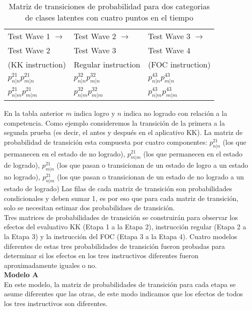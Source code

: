 \begin{table}[H]
	\centering
	\caption{Matriz de transiciones de probabilidad para dos categorias de clases latentes con cuatro puntos en el tiempo}
	\begin{tabular}{lll}
		Test Wave 1 $\rightarrow$ & Test Wave 2 $\rightarrow$ & Test Wave 3 $\rightarrow$ \\
		Test Wave 2 & Test Wave 3 & Test Wave 4 \\ 
		\hline  
		(KK instruction) & Regular instruction & (FOC instruction) \\ 
		\hline 
		$p_{n | n}^{21} p_{m | n }^{21}$ & $p_{n | n}^{32} p_{m | n }^{32}$ & $p_{n | n}^{43} p_{m | n}^{43}$ \\
		$p_{n | m}^{21} p_{m | m }^{21}$ & $p_{n | m}^{32} p_{m | m }^{32}$ & $p_{n | m}^{43} p_{m | m}^{43}$
	\end{tabular}
\end{table}
 
En la tabla anterior $m$ indica logro y $n$ indica no logrado con relaci\'{o}n a la competencia. Como ejemplo consideremos la transici\'{o}n de la primera a la segunda prueba (es decir, el antes y despu\'{e}s en el aplicativo KK). La matriz de probabilidad de transici\'{o}n esta compuesta por cuatro componentes: $p_{n | n}^{21}$ (los que permanecen en el estado de no logrado), $p_{m | m}^{21}$ (los que permanecen en el estado de logrado), $p_{m | n}^{21}$ (los que pasan o transicionan de un estado de logro a un estado no logrado), $p_{n | m}^{21}$ (los que pasan o transicionan de un estado de no logrado a un estado de logrado) 
Las filas de cada matriz de transici\'{o}n son probabilidades condicionales y deben sumar 1, es por eso que para cada matriz de transici\'{o}n, solo se necesitan estimar dos probabilidaes de transici\'{o}n.\\
Tres matrices de probabilidades de transici\'{o}n se construir\'{a}n para observar los efectos del evaluativo KK (Etapa 1 a la Etapa 2), instrucci\'{o}n regular (Etapa 2 a la Etapa 3) y la instrucci\'{o}n del FOC (Etapa 3 a la Etapa 4). Cuatro modelos diferentes de estas tres probabilidades de transici\'{o}n fueron probadas para determinar si los efectos en los tres instructivos diferentes fueron aproximadamente iguales o no.\\

\noindent
\textbf{Modelo A}\\
En este modelo, la matriz de probabilidades de transici\'{o}n para cada etapa se asume diferentes que las otras, de este modo indicamos que los efectos de todos los tres instructivos son diferentes.


